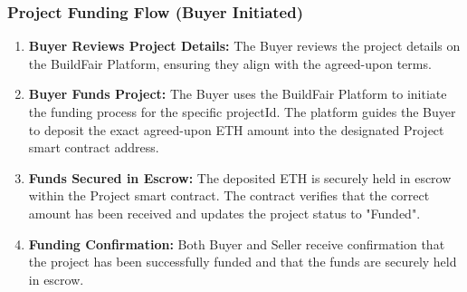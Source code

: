 \documentclass[12pt]{article}
\begin{document}
\subsubsection{Project Funding Flow (Buyer Initiated)}
\begin{enumerate}[label=\arabic*.]
    \item \textbf{Buyer Reviews Project Details:} The Buyer reviews the project details on the BuildFair Platform, ensuring they align with the agreed-upon terms.
    
    \item \textbf{Buyer Funds Project:} The Buyer uses the BuildFair Platform to initiate the funding process for the specific projectId. The platform guides the Buyer to deposit the exact agreed-upon ETH amount into the designated Project smart contract address.
    
    \item \textbf{Funds Secured in Escrow:} The deposited ETH is securely held in escrow within the Project smart contract. The contract verifies that the correct amount has been received and updates the project status to "Funded".
    
    \item \textbf{Funding Confirmation:} Both Buyer and Seller receive confirmation that the project has been successfully funded and that the funds are securely held in escrow.
\end{enumerate}
\end{document}
